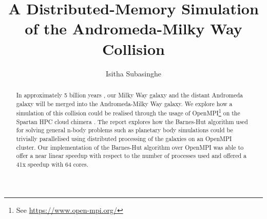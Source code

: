 \documentclass[acmtog,screen, nonacm=true]{acmart}
\begin{document}
\title{A Distributed-Memory Simulation of the Andromeda-Milky Way Collision}

\author{Isitha Subasinghe}


\renewcommand{\shortauthors}{}

\begin{abstract}
  In approximately 5 billion years \cite{sohn2012m31}, our Milky Way galaxy and the distant Andromeda galaxy will be merged into the Andromeda-Milky Way galaxy. We explore how a simulation of this collision could be realised through the usage of OpenMPI\footnote{See \url{https://www.open-mpi.org/}} on the Spartan HPC cloud chimera \cite{lafayette2017hpc} . The report explores how the Barnes-Hut \cite{barnes1986hierarchical} algorithm used for solving general n-body problems such as planetary body simulations could be trivially parallelised using distributed processing of the galaxies on an OpenMPI cluster. Our implementation of the Barnes-Hut algorithm over OpenMPI was able to offer a near linear speedup with respect to the number of processes used and offered a 41x speedup with 64 cores. 
\end{abstract}

\maketitle
\end{document}
